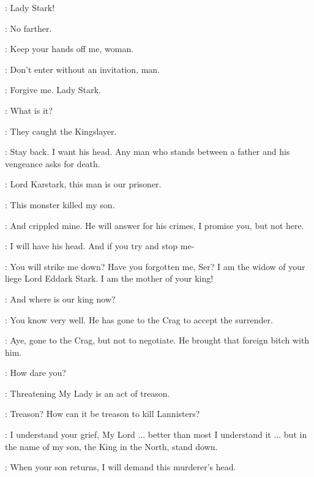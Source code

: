 \JACKS: Lady Stark!

\BRIENNE: No farther.

\JACKS: Keep your hands off me, woman.

\BRIENNE: Don't enter without an invitation, man.

\JACKS: Forgive me. Lady Stark.

\BRIENNE: What is it?

\JACKS: They caught the Kingslayer.




\KARSTARK: Stay back. I want his head. Any man who stands between a father and his vengeance asks for death.


\CATELYN: Lord Karstark, this man is our prisoner.

\KARSTARK: This monster killed my son.

\CATELYN: And crippled mine. He will answer for his crimes, I promise you, but not here.

\KARSTARK: I will have his head. And if you try and stop me-

\CATELYN: You will strike me down? Have you forgotten me, Ser? I am the widow of your liege Lord Eddark Stark. I am the mother of your king!

\KARSTARK: And where is our king now?

\CATELYN: You know very well. He has gone to the Crag to accept the surrender.

\KARSTARK: Aye, gone to the Crag, but not to negotiate. He brought that foreign bitch with him.

\CATELYN: How dare you?

\BRIENNE: Threatening My Lady is an act of treason.

\KARSTARK: Treason? How can it be treason to kill Lannisters?

\CATELYN: I understand your grief, My Lord $\ldots$ better than most I understand it $\ldots$ but in the name of my son, the King in the North, stand down.

\KARSTARK: When your son returns, I will demand this murderer's head.

